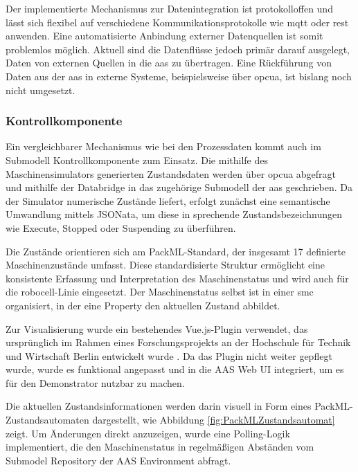 Der implementierte Mechanismus zur Datenintegration ist protokolloffen und lässt sich flexibel auf verschiedene Kommunikationsprotokolle wie \acs{mqtt} oder \acs{rest} anwenden.
Eine automatisierte Anbindung externer Datenquellen ist somit problemlos möglich.
Aktuell sind die Datenflüsse jedoch primär darauf ausgelegt, Daten von externen Quellen in die \acs{aas} zu übertragen.
Eine Rückführung von Daten aus der \acs{aas} in externe Systeme, beispielsweise über \acs{opcua}, ist bislang noch nicht umgesetzt.

\subsubsection*{Kontrollkomponente}
\vspace{-0.5em}
Ein vergleichbarer Mechanismus wie bei den Prozessdaten kommt auch im Submodell Kontrollkomponente zum Einsatz. 
Die mithilfe des Maschinensimulators generierten Zustandsdaten werden über \acs{opcua} abgefragt und mithilfe der Databridge in das zugehörige Submodell der \acs{aas} geschrieben. 
Da der Simulator numerische Zustände liefert, erfolgt zunächst eine semantische Umwandlung mittels JSONata, um diese in sprechende Zustandsbezeichnungen wie Execute, Stopped oder Suspending zu überführen.

Die Zustände orientieren sich am PackML-Standard, der insgesamt 17 definierte Maschinenzustände umfasst. 
Diese standardisierte Struktur ermöglicht eine konsistente Erfassung und Interpretation des Maschinenstatus und wird auch für die robocell-Linie eingesetzt.
Der Maschinenstatus selbst ist in einer \acs{smc} organisiert, in der eine Property den aktuellen Zustand abbildet.

Zur Visualisierung wurde ein bestehendes Vue.js-Plugin verwendet, das ursprünglich im Rahmen eines Forschungsprojekts an der Hochschule für Technik und Wirtschaft Berlin entwickelt wurde \cite{HTW1}\cite{HTW2}. 
Da das Plugin nicht weiter gepflegt wurde, wurde es funktional angepasst und in die AAS Web UI integriert, um es für den Demonstrator nutzbar zu machen.

Die aktuellen Zustandsinformationen werden darin visuell in Form eines PackML-Zu\-standsautomaten dargestellt, wie Abbildung \ref{fig:PackMLZustandsautomat} zeigt. 
Um Änderungen direkt anzuzeigen, wurde eine Polling-Logik implementiert, die den Maschinenstatus in regelmäßigen Abständen vom Submodel Repository der AAS Environment abfragt.

